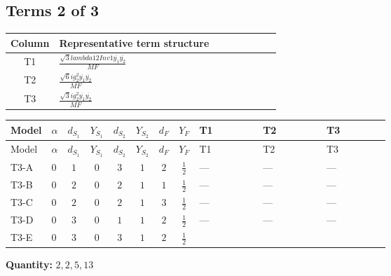 \documentclass[8pt]{article}
\begin{document}
\begin{landscape}
\subsection*{Terms 2 of 3}
\begin{center}
\begin{tabular}{@{}c >{\raggedright\arraybackslash}p{0.82\linewidth}@{}}
\toprule
Column & Representative term structure \\
\midrule
T1 & \(\displaystyle \frac{\sqrt{3} lambda12Inv1 \overline{y_{1}} \overline{y_{2}}}{MF}\) \\
\midrule
T2 & \(\displaystyle \frac{\sqrt{6} i g_{2}^{2} \overline{y_{1}} \overline{y_{2}}}{MF}\) \\
\midrule
T3 & \(\displaystyle \frac{\sqrt{3} i g_{2}^{2} \overline{y_{1}} \overline{y_{2}}}{MF}\) \\
\midrule
\bottomrule
\end{tabular}
\end{center}
\smallskip
\tiny
\begin{longtable}{@{}llcccccc >{\raggedright\arraybackslash}p{0.21\linewidth} >{\raggedright\arraybackslash}p{0.21\linewidth} >{\raggedright\arraybackslash}p{0.21\linewidth}@{}}
\toprule
Model & $\alpha$ & $d_{S_1}$ & $Y_{S_1}$ & $d_{S_2}$ & $Y_{S_2}$ & $d_F$ & $Y_F$ & T1 & T2 & T3 \\
\midrule
\endfirsthead
\toprule
Model & $\alpha$ & $d_{S_1}$ & $Y_{S_1}$ & $d_{S_2}$ & $Y_{S_2}$ & $d_F$ & $Y_F$ & T1 & T2 & T3 \\
\midrule
\endhead
T3-A & $0$ & $1$ & $0$ & $3$ & $1$ & $2$ & $\frac{1}{2}$ & --- & --- & --- \\
\midrule
T3-B & $0$ & $2$ & $0$ & $2$ & $1$ & $1$ & $\frac{1}{2}$ & --- & --- & --- \\
\midrule
T3-C & $0$ & $2$ & $0$ & $2$ & $1$ & $3$ & $\frac{1}{2}$ & --- & --- & --- \\
\midrule
T3-D & $0$ & $3$ & $0$ & $1$ & $1$ & $2$ & $\frac{1}{2}$ & --- & --- & --- \\
\midrule
T3-E & $0$ & $3$ & $0$ & $3$ & $1$ & $2$ & $\frac{1}{2}$ & \scriptsize\adjustbox{max width=\linewidth}{$\begin{gathered} \frac{\sqrt{3} lambda12Inv1 \overline{y_{1}} \overline{y_{2}}}{6 MF}\end{gathered}$} & \scriptsize\adjustbox{max width=\linewidth}{$\begin{gathered} \frac{\sqrt{6} i g_{2}^{2} \overline{y_{1}} \overline{y_{2}}}{3 MF}\end{gathered}$} & \scriptsize\adjustbox{max width=\linewidth}{$\begin{gathered} \frac{\sqrt{3} i g_{2}^{2} \overline{y_{1}} \overline{y_{2}}}{6 MF}\end{gathered}$} \\
\midrule
\bottomrule
\end{longtable}
\clearpage
\noindent\textbf{Quantity: }$\mathrm{2,2,5,13}$\par\smallskip

\end{landscape}
\end{document}
